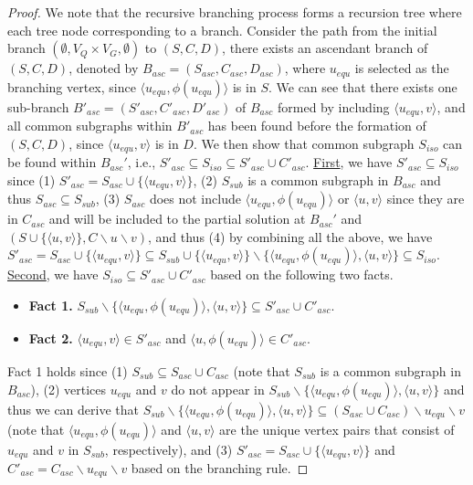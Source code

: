 \begin{proof}
    We note that the recursive branching process forms a recursion tree where each tree node corresponding to a branch. Consider the path from the initial branch $(\emptyset, V_Q\times V_G,\emptyset)$ to $(S,C,D)$, there exists an ascendant branch of $(S,C,D)$, denoted by $B_{asc}=(S_{asc},C_{asc},D_{asc})$, where $u_{equ}$ is selected as the branching vertex, since $\langle u_{equ},\phi(u_{equ}) \rangle$ is in $S$.
    We can see that there exists one sub-branch $B'_{asc}=(S'_{asc},C'_{asc},D'_{asc})$ of $B_{asc}$ formed by including $\langle u_{equ},v \rangle$, and all common subgraphs within $B'_{asc}$ has been found before the formation of $(S,C,D)$, since $\langle u_{equ},v \rangle$ is in $D$. We then show that common subgraph $S_{iso}$ can be found within $B_{asc}'$, i.e., $S'_{asc}\subseteq S_{iso}\subseteq S'_{asc}\cup C'_{asc}$. 
    \underline{First}, we have $S'_{asc}\subseteq S_{iso}$ since (1) $S'_{asc}=S_{asc}\cup\{\langle u_{equ},v \rangle\}$, (2) $S_{sub}$ is a common subgraph in $B_{asc}$ and thus $S_{asc}\subseteq S_{sub}$, (3) $S_{asc}$ does not include $\langle u_{equ},\phi(u_{equ})\rangle$ or $\langle u,v\rangle$ since they are in $C_{asc}$ and will be included to the partial solution at $B_{asc}'$ and $(S\cup \{\langle u,v \rangle\}, C\backslash u\backslash v)$, and thus (4) by combining all the above, we have  $S'_{asc}=S_{asc}\cup\{\langle u_{equ},v \rangle\}\subseteq S_{sub}\cup\{\langle u_{equ},v \rangle\} \backslash \{\langle u_{equ},\phi(u_{equ})\rangle,\langle u,v\rangle\}\subseteq S_{iso}$. 
    \underline{Second}, we have $S_{iso}\subseteq S'_{asc}\cup C'_{asc}$ based on the following two facts. 

    \begin{itemize}
        \item \textbf{Fact 1.} $S_{sub}\backslash\{\langle u_{equ},\phi(u_{equ})\rangle,\langle u,v\rangle\}\subseteq S'_{asc}\cup C'_{asc}$.
        \item \textbf{Fact 2.} $\langle u_{equ},v \rangle\in S'_{asc}$ and $\langle u,\phi(u_{equ}) \rangle\in C'_{asc}$.
    \end{itemize}
    
    Fact 1 holds since (1) $S_{sub}\subseteq S_{asc}\cup C_{asc}$ (note that $S_{sub}$ is a common subgraph in $B_{asc}$), (2) vertices $u_{equ}$ and $v$ do not appear in $S_{sub}\backslash\{\langle u_{equ},\phi(u_{equ})\rangle,\langle u,v\rangle\}$ and thus we can derive that $S_{sub}\backslash\{\langle u_{equ},\phi(u_{equ})\rangle,\langle u,v\rangle\}\subseteq (S_{asc}\cup C_{asc})\backslash u_{equ}\backslash v$ (note that $\langle u_{equ},\phi(u_{equ})\rangle$ and $\langle u,v\rangle$ are the unique vertex pairs that consist of $u_{equ}$ and $v$  in $S_{sub}$, respectively), and (3) $S'_{asc}=S_{asc}\cup \{\langle u_{equ},v\rangle\}$ and $C'_{asc}=C_{asc}\backslash u_{equ}\backslash v$ based on the branching rule.


\end{proof}
